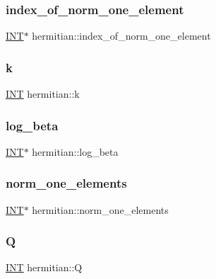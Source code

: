 \subsubsection{\texorpdfstring{index\+\_\+of\+\_\+norm\+\_\+one\+\_\+element}{index\_of\_norm\_one\_element}}
{\footnotesize\ttfamily \mbox{\hyperlink{galois_8h_a09fddde158a3a20bd2dcadb609de11dc}{I\+NT}}$\ast$ hermitian\+::index\+\_\+of\+\_\+norm\+\_\+one\+\_\+element}

\mbox{\label{classhermitian_a8b0e35be8db5206cf8b1e4d55231d0b5}} 
\subsubsection{\texorpdfstring{k}{k}}
{\footnotesize\ttfamily \mbox{\hyperlink{galois_8h_a09fddde158a3a20bd2dcadb609de11dc}{I\+NT}} hermitian\+::k}

\mbox{\label{classhermitian_a3bc138034a7c78082f7c03301ffcdc79}} 
\subsubsection{\texorpdfstring{log\+\_\+beta}{log\_beta}}
{\footnotesize\ttfamily \mbox{\hyperlink{galois_8h_a09fddde158a3a20bd2dcadb609de11dc}{I\+NT}}$\ast$ hermitian\+::log\+\_\+beta}

\mbox{\label{classhermitian_a5d7acaf822dc7919704602943f4bfd39}} 
\subsubsection{\texorpdfstring{norm\+\_\+one\+\_\+elements}{norm\_one\_elements}}
{\footnotesize\ttfamily \mbox{\hyperlink{galois_8h_a09fddde158a3a20bd2dcadb609de11dc}{I\+NT}}$\ast$ hermitian\+::norm\+\_\+one\+\_\+elements}

\mbox{\label{classhermitian_ae2341a7f756f0e2fce3747c6ef4ae656}} 
\subsubsection{\texorpdfstring{Q}{Q}}
{\footnotesize\ttfamily \mbox{\hyperlink{galois_8h_a09fddde158a3a20bd2dcadb609de11dc}{I\+NT}} hermitian\+::Q}

